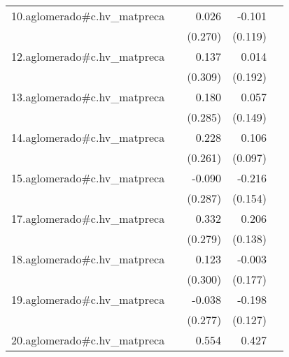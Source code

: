 {\begin{longtable}{l*{4}{D{.}{.}{-1}}}
\addlinespace
10.aglomerado#c.hv\_matpreca&                     &       0.026         &      -0.101         &                     \\
            &                     &     (0.270)         &     (0.119)         &                     \\
\addlinespace
12.aglomerado#c.hv\_matpreca&                     &       0.137         &       0.014         &                     \\
            &                     &     (0.309)         &     (0.192)         &                     \\
\addlinespace
13.aglomerado#c.hv\_matpreca&                     &       0.180         &       0.057         &                     \\
            &                     &     (0.285)         &     (0.149)         &                     \\
\addlinespace
14.aglomerado#c.hv\_matpreca&                     &       0.228         &       0.106         &                     \\
            &                     &     (0.261)         &     (0.097)         &                     \\
\addlinespace
15.aglomerado#c.hv\_matpreca&                     &      -0.090         &      -0.216         &                     \\
            &                     &     (0.287)         &     (0.154)         &                     \\
\addlinespace
17.aglomerado#c.hv\_matpreca&                     &       0.332         &       0.206         &                     \\
            &                     &     (0.279)         &     (0.138)         &                     \\
\addlinespace
18.aglomerado#c.hv\_matpreca&                     &       0.123         &      -0.003         &                     \\
            &                     &     (0.300)         &     (0.177)         &                     \\
\addlinespace
19.aglomerado#c.hv\_matpreca&                     &      -0.038         &      -0.198         &                     \\
            &                     &     (0.277)         &     (0.127)         &                     \\
\addlinespace
20.aglomerado#c.hv\_matpreca&                     &       0.554         &       0.427         &                     \\

\end{longtable}}
